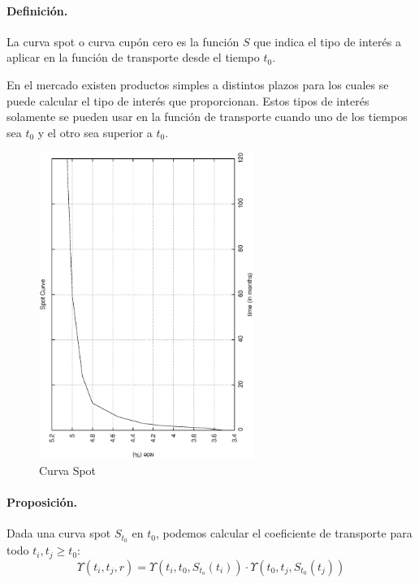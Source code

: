 \paragraph{Definici\'on.} La curva spot o curva cup\'on cero es la funci\'on
$S$ que indica el tipo de inter\'es a aplicar en la funci\'on de transporte
desde el tiempo $t_0$.

En el mercado existen productos simples a distintos plazos para los cuales se 
puede calcular el tipo de inter\'es que proporcionan. Estos tipos de inter\'es
solamente se pueden usar en la funci\'on de transporte cuando uno de los
tiempos sea $t_0$ y el otro sea superior a $t_0$.

\begin{figure}[!hb]
\begin{center}
\includegraphics[height=10cm, angle=-90]{./images/spot.ps}
\caption{Curva Spot}
\label{spot}
\end{center}
\end{figure}

\paragraph{Proposici\'on.} Dada una curva spot $S_{t_0}$ en $t_0$, podemos calcular
el coeficiente de transporte para todo $t_i, t_j \ge t_0$:
\begin{displaymath}
\Upsilon(t_i,t_j, r) = 
\Upsilon(t_i,t_0, S_{t_o}(t_i)) \cdot \Upsilon(t_0,t_j, S_{t_0}(t_j))
\end{displaymath}



